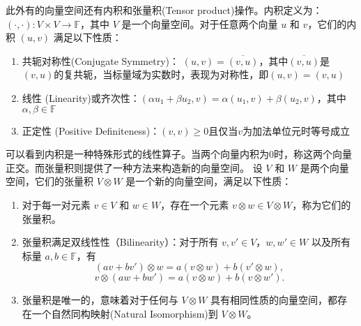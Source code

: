 此外有的向量空间还有内积和张量积(Tensor product)操作。内积定义为：\(( \cdot, \cdot ): V \times V \rightarrow \mathbb{F}\)，其中 $V$ 是一个向量空间。对于任意两个向量 $u$ 和 $v$，它们的内积 $( u, v )$ 满足以下性质：
\begin{enumerate}
    \item 共轭对称性(Conjugate Symmetry)： \(( u, v ) = \overline{( v, u )}\)，其中\(\overline{( v, u )}\)是\(( v, u )\)的复共轭，当标量域为实数时，表现为对称性，即\(( u, v ) = ( v, u )\)
    \item 线性 (Linearity)或齐次性：\(( \alpha u_1 + \beta u_2, v ) = \alpha( u_1, v ) + \beta( u_2, v )\)，其中\(\alpha,\beta\in\mathbb{F}\)
    \item 正定性 (Positive Definiteness)：\(( v, v ) \geq 0\)且仅当\(v \)为加法单位元时等号成立
\end{enumerate}
可以看到内积是一种特殊形式的线性算子。当两个向量内积为$0$时，称这两个向量正交。而张量积则提供了一种方法来构造新的向量空间。
设 \(V\) 和 \(W\) 是两个向量空间，它们的张量积 \(V \otimes W\) 是一个新的向量空间，满足以下性质：
\begin{enumerate}
    \item 对于每一对元素 \(v \in V\) 和 \(w \in W\)，存在一个元素 \(v \otimes w \in V \otimes W\)，称为它们的张量积。
    \item 张量积满足双线性性（Bilinearity）：对于所有 \(v,v' \in V\)，\(w,w' \in W\) 以及所有标量 \(a,b \in \mathbb{F}\)，有
    \[
    (av + bv') \otimes w = a(v \otimes w) + b(v' \otimes w),
    \]
    \[
    v \otimes (aw + bw') = a(v \otimes w) + b(v \otimes w').
    \]
    \item 张量积是唯一的，意味着对于任何与 \(V \otimes W\) 具有相同性质的向量空间，都存在一个自然同构映射(Natural Isomorphism)到 \(V \otimes W\)。
\end{enumerate}

